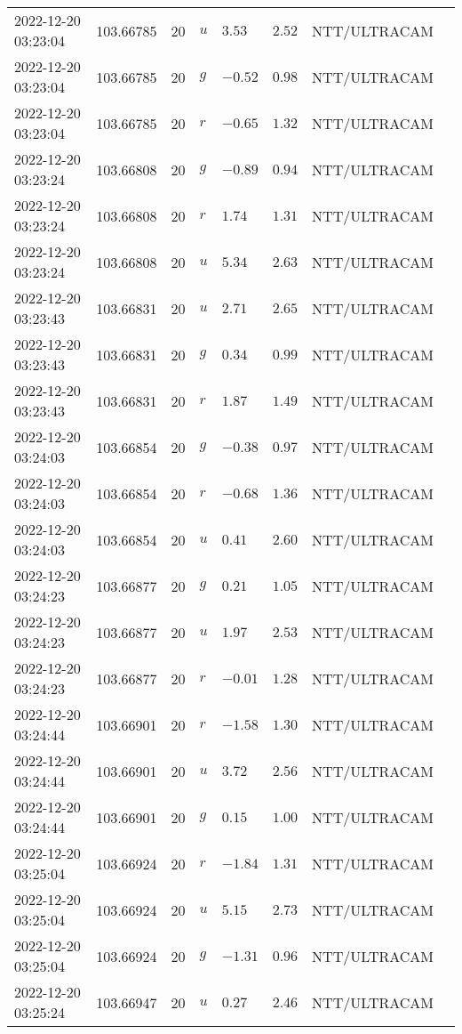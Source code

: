 \documentclass{nature_plusfigure}
\begin{document}
\begin{supplement}
\begin{center}
\begin{longtable}{llllllll}
2022-12-20 03:23:04 & 103.66785 & 20 & $u$ & $3.53$ & $2.52$ & NTT/ULTRACAM &  \\ 
2022-12-20 03:23:04 & 103.66785 & 20 & $g$ & $-0.52$ & $0.98$ & NTT/ULTRACAM &  \\ 
2022-12-20 03:23:04 & 103.66785 & 20 & $r$ & $-0.65$ & $1.32$ & NTT/ULTRACAM &  \\ 
2022-12-20 03:23:24 & 103.66808 & 20 & $g$ & $-0.89$ & $0.94$ & NTT/ULTRACAM &  \\ 
2022-12-20 03:23:24 & 103.66808 & 20 & $r$ & $1.74$ & $1.31$ & NTT/ULTRACAM &  \\ 
2022-12-20 03:23:24 & 103.66808 & 20 & $u$ & $5.34$ & $2.63$ & NTT/ULTRACAM &  \\ 
2022-12-20 03:23:43 & 103.66831 & 20 & $u$ & $2.71$ & $2.65$ & NTT/ULTRACAM &  \\ 
2022-12-20 03:23:43 & 103.66831 & 20 & $g$ & $0.34$ & $0.99$ & NTT/ULTRACAM &  \\ 
2022-12-20 03:23:43 & 103.66831 & 20 & $r$ & $1.87$ & $1.49$ & NTT/ULTRACAM &  \\ 
2022-12-20 03:24:03 & 103.66854 & 20 & $g$ & $-0.38$ & $0.97$ & NTT/ULTRACAM &  \\ 
2022-12-20 03:24:03 & 103.66854 & 20 & $r$ & $-0.68$ & $1.36$ & NTT/ULTRACAM &  \\ 
2022-12-20 03:24:03 & 103.66854 & 20 & $u$ & $0.41$ & $2.60$ & NTT/ULTRACAM &  \\ 
2022-12-20 03:24:23 & 103.66877 & 20 & $g$ & $0.21$ & $1.05$ & NTT/ULTRACAM &  \\ 
2022-12-20 03:24:23 & 103.66877 & 20 & $u$ & $1.97$ & $2.53$ & NTT/ULTRACAM &  \\ 
2022-12-20 03:24:23 & 103.66877 & 20 & $r$ & $-0.01$ & $1.28$ & NTT/ULTRACAM &  \\ 
2022-12-20 03:24:44 & 103.66901 & 20 & $r$ & $-1.58$ & $1.30$ & NTT/ULTRACAM &  \\ 
2022-12-20 03:24:44 & 103.66901 & 20 & $u$ & $3.72$ & $2.56$ & NTT/ULTRACAM &  \\ 
2022-12-20 03:24:44 & 103.66901 & 20 & $g$ & $0.15$ & $1.00$ & NTT/ULTRACAM &  \\ 
2022-12-20 03:25:04 & 103.66924 & 20 & $r$ & $-1.84$ & $1.31$ & NTT/ULTRACAM &  \\ 
2022-12-20 03:25:04 & 103.66924 & 20 & $u$ & $5.15$ & $2.73$ & NTT/ULTRACAM &  \\ 
2022-12-20 03:25:04 & 103.66924 & 20 & $g$ & $-1.31$ & $0.96$ & NTT/ULTRACAM &  \\ 
2022-12-20 03:25:24 & 103.66947 & 20 & $u$ & $0.27$ & $2.46$ & NTT/ULTRACAM &  \\ 

\end{longtable}
\end{center}
\end{supplement}
\end{document}

